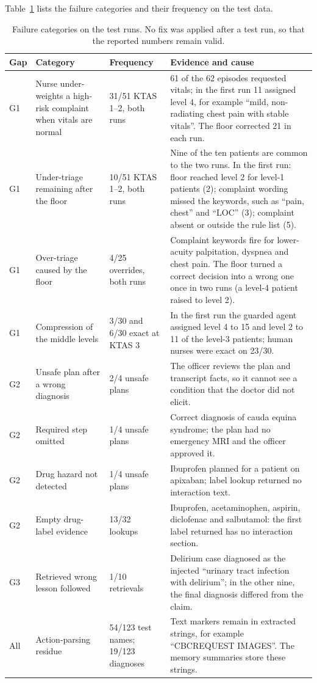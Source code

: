 \documentclass[conference]{IEEEtran}
\begin{document}
Table~\ref{tab:failures} lists the failure categories and their frequency on the test data.

\begin{table}[t]
\caption{Failure categories on the test runs. No fix was applied after a test run, so that the reported numbers remain valid.}
\label{tab:failures}
\centering
\small
\begin{tabular}{p{1.0cm}p{5.0cm}p{1.8cm}p{8.0cm}}
\toprule
Gap & Category & Frequency & Evidence and cause \\
\midrule
G1 & Nurse under-weights a high-risk complaint when vitals are normal & 31/51 KTAS 1--2, both runs & 61 of the 62 episodes requested vitals; in the first run 11 assigned level 4, for example ``mild, non-radiating chest pain with stable vitals''. The floor corrected 21 in each run. \\
G1 & Under-triage remaining after the floor & 10/51 KTAS 1--2, both runs & Nine of the ten patients are common to the two runs. In the first run: floor reached level 2 for level-1 patients (2); complaint wording missed the keywords, such as ``pain, chest'' and ``LOC'' (3); complaint absent or outside the rule list (5). \\
G1 & Over-triage caused by the floor & 4/25 overrides, both runs & Complaint keywords fire for lower-acuity palpitation, dyspnea and chest pain. The floor turned a correct decision into a wrong one once in two runs (a level-4 patient raised to level 2). \\
G1 & Compression of the middle levels & 3/30 and 6/30 exact at KTAS 3 & In the first run the guarded agent assigned level 4 to 15 and level 2 to 11 of the level-3 patients; human nurses were exact on 23/30. \\
G2 & Unsafe plan after a wrong diagnosis & 2/4 unsafe plans & The officer reviews the plan and transcript facts, so it cannot see a condition that the doctor did not elicit. \\
G2 & Required step omitted & 1/4 unsafe plans & Correct diagnosis of cauda equina syndrome; the plan had no emergency MRI and the officer approved it. \\
G2 & Drug hazard not detected & 1/4 unsafe plans & Ibuprofen planned for a patient on apixaban; label lookup returned no interaction text. \\
G2 & Empty drug-label evidence & 13/32 lookups & Ibuprofen, acetaminophen, aspirin, diclofenac and salbutamol: the first label returned has no interaction section. \\
G3 & Retrieved wrong lesson followed & 1/10 retrievals & Delirium case diagnosed as the injected ``urinary tract infection with delirium''; in the other nine, the final diagnosis differed from the claim. \\
All & Action-parsing residue & 54/123 test names; 19/123 diagnoses & Text markers remain in extracted strings, for example ``CBCREQUEST IMAGES''. The memory summaries store these strings. \\
\bottomrule
\end{tabular}
\end{table}
\end{document}
